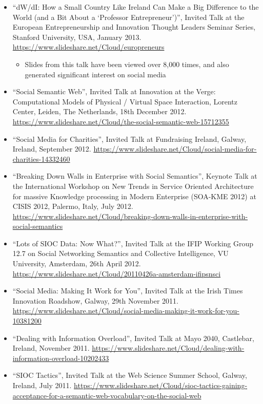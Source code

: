 \documentclass[10pt,a4paper]{res} %
\begin{document}
\begin{resume}
\begin{itemize}
\item ``dW/dI: How a Small Country Like Ireland Can Make a Big Difference to the World (and a Bit About a `Professor Entrepreneur')'', Invited Talk at the European Entrepreneurship and Innovation Thought Leaders Seminar Series, Stanford University, USA, January 2013. \url{https://www.slideshare.net/Cloud/europreneurs}
\begin{itemize} \itemsep -2pt
\item Slides from this talk have been viewed over 8,000 times, and also generated significant interest on social media
\end{itemize}
\item ``Social Semantic Web'', Invited Talk at Innovation at the Verge: Computational Models of Physical / Virtual Space Interaction, Lorentz Center, Leiden, The Netherlands, 18th December 2012. \url{https://www.slideshare.net/Cloud/the-social-semantic-web-15712355}
\item ``Social Media for Charities'', Invited Talk at Fundraising Ireland, Galway, Ireland, September 2012. \url{https://www.slideshare.net/Cloud/social-media-for-charities-14332460}
\item ``Breaking Down Walls in Enterprise with Social Semantics'', Keynote Talk at the International Workshop on New Trends in Service Oriented Architecture for massive Knowledge processing in Modern Enterprise (SOA-KME 2012) at CISIS 2012, Palermo, Italy, July 2012. \url{https://www.slideshare.net/Cloud/breaking-down-walls-in-enterprise-with-social-semantics}
\item ``Lots of SIOC Data: Now What?'', Invited Talk at the IFIP Working Group 12.7 on Social Networking Semantics and Collective Intelligence, VU University, Amsterdam, 26th April 2012. \url{https://www.slideshare.net/Cloud/20110426a-amsterdam-ifipsnsci}
\item ``Social Media: Making It Work for You'', Invited Talk at the Irish Times Innovation Roadshow, Galway, 29th November 2011. \url{https://www.slideshare.net/Cloud/social-media-making-it-work-for-you-10381200}
\item ``Dealing with Information Overload'', Invited Talk at Mayo 2040, Castlebar, Ireland, November 2011. \url{https://www.slideshare.net/Cloud/dealing-with-information-overload-10202433}
\item ``SIOC Tactics'', Invited Talk at the Web Science Summer School, Galway, Ireland, July 2011. \url{https://www.slideshare.net/Cloud/sioc-tactics-gaining-acceptance-for-a-semantic-web-vocabulary-on-the-social-web}

\end{itemize}
\end{resume}
\end{document}
